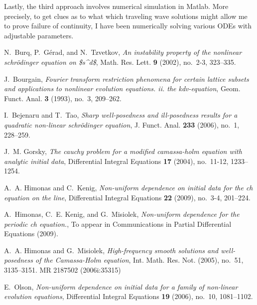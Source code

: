 \documentclass[12pt,reqno]{amsart}
\begin{document}
Lastly, the third approach involves numerical simulation in Matlab. More
precisely, to get clues as to what which traveling wave solutions might allow me
to prove failure of continuity, I have been numerically solving various ODEs
with adjustable parameters. 

\providecommand{\bysame}{\leavevmode\hbox to3em{\hrulefill}\thinspace}
\providecommand{\MR}{\relax\ifhmode\unskip\space\fi MR }
\providecommand{\MRhref}[2]{%
  \href{http://www.ams.org/mathscinet-getitem?mr=#1}{#2}
}
\providecommand{\href}[2]{#2}
\begin{thebibliography}{HKM09}

N.~Burq, P.~G{\'e}rad, and N.~Tzvetkov, \emph{An instability property of the
  nonlinear schr{\"o}dinger equation on {\$}s\^{}d{\$}}, Math. Res. Lett.
  \textbf{9} (2002), no.~2-3, 323--335.

J.~Bourgain, \emph{Fourier transform restriction phenomena for certain lattice
  subsets and applications to nonlinear evolution equations. ii. the
  kdv-equation}, Geom. Funct. Anal. \textbf{3} (1993), no.~3, 209--262.

I.~Bejenaru and T.~Tao, \emph{Sharp well-posedness and ill-posedness results
  for a quadratic non-linear schr{\"o}dinger equation}, J. Funct. Anal.
  \textbf{233} (2006), no.~1, 228--259.

J.~M. Gorsky, \emph{The cauchy problem for a modified camassa-holm equation
  with analytic initial data}, Differential Integral Equations \textbf{17}
  (2004), no.~11-12, 1233--1254.

A.~A. Himonas and C.~Kenig, \emph{Non-uniform dependence on initial data for
  the ch equation on the line}, Differential Integral Equations \textbf{22}
  (2009), no.~3-4, 201--224.

A.~Himonas, C.~E. Kenig, and G.~Misiolek, \emph{Non-uniform dependence for the
  periodic ch equation.}, To appear in Communications in Partial Differential
  Equations (2009).

A.~A. Himonas and G.~Misiolek, \emph{High-frequency smooth solutions and
  well-posedness of the {C}amassa-{H}olm equation}, Int. Math. Res. Not.
  (2005), no.~51, 3135--3151. \MR{2187502 (2006i:35315)}

E.~Olson, \emph{Non-uniform dependence on initial data for a family of
  non-linear evolution equations}, Differential Integral Equations \textbf{19}
  (2006), no.~10, 1081--1102.

\end{thebibliography}
%
%
\end{document}
